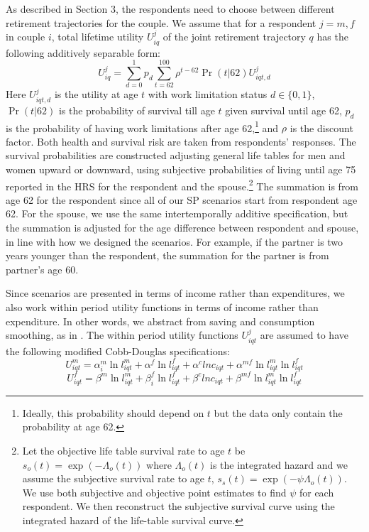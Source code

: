 \documentclass[11pt,letter]{article}
\begin{document}
\par As described in Section 3, the respondents need to choose between different retirement trajectories for the couple. We assume that for a respondent $j=m,f$ in couple $i$, total lifetime utility $U_{iq}^{j}$ of the joint retirement trajectory $q$ has the following additively separable form:
\begin{equation} \label{intertemp}
U^{j}_{iq}=\sum_{d=0}^1 p_d \sum_{t=62}^{100} \rho^{t-62}\Pr(t|62)U_{iqt,d}^{j}
\end{equation}
Here $U_{iqt,d}^{j}$ is the utility at age $t$ with work limitation status $d \in \{0,1\}$, $\Pr(t|62)$ is the probability of survival till age $t$ given survival until age 62, $p_d$ is the probability of having work limitations after age 62,\footnote{Ideally, this probability should depend on $t$ but the data only contain the probability at age 62.} and $\rho$ is the discount factor. Both health and survival risk are taken from respondents' responses. The survival probabilities are constructed adjusting general life tables for men and women upward or downward, using subjective probabilities of living until age 75 reported in the HRS for the respondent and the spouse.\footnote{Let the objective life table survival rate to age $t$ be $s_o(t)=\exp(-\Lambda_o(t))$ where $\Lambda_o(t)$ is the integrated hazard and we assume the subjective survival rate to age $t$, $s_s(t) = \exp(-\psi\Lambda_o(t))$. We use both subjective and objective point estimates to find $\psi$ for each respondent. We then reconstruct the subjective survival curve using the integrated hazard of the life-table survival curve.} The summation is from age 62 for the respondent since all of our SP scenarios start from respondent age 62. For the spouse, we use the same intertemporally additive specification, but the summation is adjusted for the age difference between respondent and spouse, in line with how we designed the scenarios. For example, if the partner is two years younger than the respondent, the summation for the partner is from partner's age 60.

\par Since scenarios are presented in terms of income rather than expenditures, we also work within period utility functions in terms of income rather than expenditure. In other words, we abstract from saving and consumption smoothing, as in \citet{vsoest2014}. The within period utility functions $U_{iqt}^{j}$ are assumed to have the following modified Cobb-Douglas specifications:
\begin{equation} \label{uman}
 U_{iqt}^{m}=\alpha_{i}^{m}\ln l_{iqt}^{m}+\alpha^{f}\ln l_{iqt}^{f}+\alpha^{c}ln{c_{iqt}}+\alpha^{mf}\ln l_{iqt}^{m}\ln l_{iqt}^{f}
\end{equation}
\begin{equation} \label{uwoman}
 U_{iqt}^{f}=\beta^{m}\ln l_{iqt}^{m}+\beta_{i}^{f}\ln l_{iqt}^{f}+\beta^{c}ln{c_{iqt}}+\beta^{mf}\ln l_{iqt}^{m}\ln l_{iqt}^{f}
\end{equation}
\end{document}
